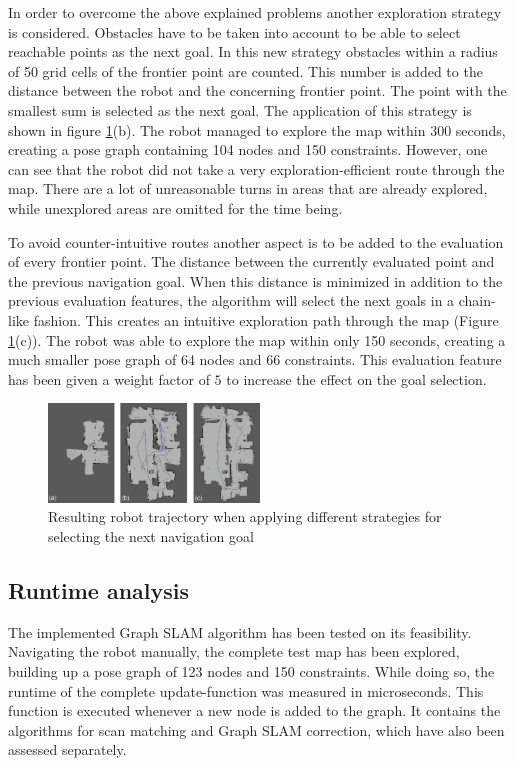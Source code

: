 \documentclass{ba-kecs}
\begin{document}
In order to overcome the above explained problems another exploration strategy is considered. Obstacles have to be taken into account to be able to select reachable points as the next goal. In this new strategy obstacles within a radius of 50 grid cells of the frontier point are counted. This number is added to the distance between the robot and the concerning frontier point. The point with the smallest sum is selected as the next goal. The application of this strategy is shown in figure \ref{fig:navigation_comparison}(b). The robot managed to explore the map within 300 seconds, creating a pose graph containing 104 nodes and 150 constraints. However, one can see that the robot did not take a very exploration-efficient route through the map. There are a lot of unreasonable turns in areas that are already explored, while unexplored areas are omitted for the time being.

To avoid counter-intuitive routes another aspect is to be added to the evaluation of every frontier point. The distance between the currently evaluated point and the previous navigation goal. When this distance is minimized in addition to the previous evaluation features, the algorithm will select the next goals in a chain-like fashion. This creates an intuitive exploration path through the map (Figure \ref{fig:navigation_comparison}(c)). The robot was able to explore the map within only 150 seconds, creating a much smaller pose graph of 64 nodes and 66 constraints. This evaluation feature has been given a weight factor of $5$ to increase the effect on the goal selection.

\begin{figure}[htbp]
	\centering
		\includegraphics[width=0.50\textwidth]{figures/Navigation_comparison.jpg}
	\caption{Resulting robot trajectory when applying different strategies for selecting the next navigation goal}
	\label{fig:navigation_comparison}
\end{figure}

\subsection{Runtime analysis}
\label{sec:runtime}
The implemented Graph SLAM algorithm has been tested on its feasibility. Navigating the robot manually, the complete test map has been explored, building up a pose graph of 123 nodes and 150 constraints. While doing so, the runtime of the complete update-function was measured in microseconds. This function is executed whenever a new node is added to the graph. It contains the algorithms for scan matching and Graph SLAM correction, which have also been assessed separately.
\end{document}
